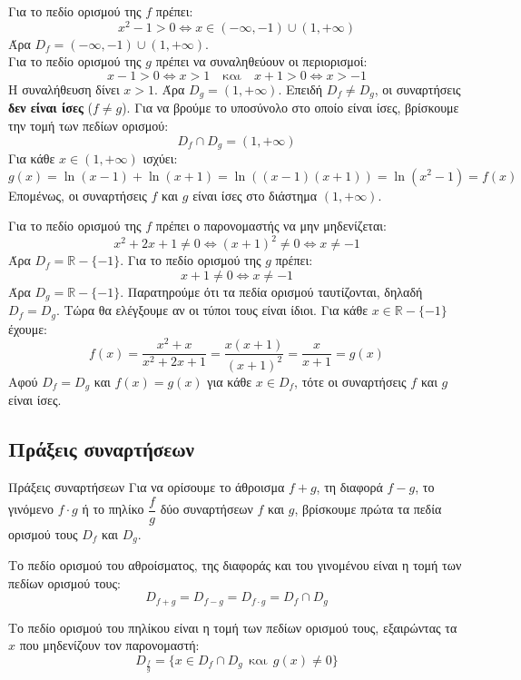 \lysh
\begin{alist}
\item Για το πεδίο ορισμού της $f$ πρέπει:
\[ x^2 - 1 > 0 \Leftrightarrow x \in (-\infty, -1) \cup (1, +\infty) \]
Άρα $D_f = (-\infty, -1) \cup (1, +\infty)$.\\
Για το πεδίο ορισμού της $g$ πρέπει να συναληθεύουν οι περιορισμοί:
\[ x - 1 > 0 \Leftrightarrow x > 1 \quad \text{και} \quad x + 1 > 0 \Leftrightarrow x > -1 \]
Η συναλήθευση δίνει $x > 1$. Άρα $D_g = (1, +\infty)$. Επειδή $D_f \neq D_g$, οι συναρτήσεις \textbf{δεν είναι ίσες} ($f \neq g$). Για να βρούμε το υποσύνολο στο οποίο είναι ίσες, βρίσκουμε την τομή των πεδίων ορισμού:
\[ D_f \cap D_g = (1, +\infty) \]
Για κάθε $x \in (1, +\infty)$ ισχύει:
\[ g(x) = \ln(x-1) + \ln(x+1) = \ln\left((x-1)(x+1)\right) = \ln(x^2 - 1) = f(x) \]
Επομένως, οι συναρτήσεις $f$ και $g$ είναι ίσες στο διάστημα $(1, +\infty)$.

\item Για το πεδίο ορισμού της $f$ πρέπει ο παρονομαστής να μην μηδενίζεται:
\[ x^2+2x+1 \neq 0 \Leftrightarrow (x+1)^2 \neq 0 \Leftrightarrow x \neq -1 \]
Άρα $D_f = \mathbb{R} - \{-1\}$. Για το πεδίο ορισμού της $g$ πρέπει:
\[ x+1 \neq 0 \Leftrightarrow x \neq -1 \]
Άρα $D_g = \mathbb{R} - \{-1\}$. Παρατηρούμε ότι τα πεδία ορισμού ταυτίζονται, δηλαδή $D_f = D_g$. Τώρα θα ελέγξουμε αν οι τύποι τους είναι ίδιοι. Για κάθε $x \in \mathbb{R} - \{-1\}$ έχουμε:
\[ f(x) = \dfrac{x^2+x}{x^2+2x+1} = \dfrac{x(x+1)}{(x+1)^2} = \dfrac{x}{x+1} = g(x) \]
Αφού $D_f = D_g$ και $f(x) = g(x)$ για κάθε $x \in D_f$, τότε οι συναρτήσεις $f$ και $g$ είναι ίσες.
\end{alist}

\subsection{Πράξεις συναρτήσεων}
\begin{askhsh}{Πράξεις συναρτήσεων}
Για να ορίσουμε το άθροισμα $f+g$, τη διαφορά $f-g$, το γινόμενο $f\cdot g$ ή το πηλίκο $\dfrac{f}{g}$ δύο συναρτήσεων $f$ και $g$, βρίσκουμε πρώτα τα πεδία ορισμού τους $D_f$ και $D_g$.\\
\bhmata
\begin{bhma}
\item Το πεδίο ορισμού του αθροίσματος, της διαφοράς και του γινομένου είναι η τομή των πεδίων ορισμού τους:
\[ D_{f+g}=D_{f-g}=D_{f\cdot g} = D_f \cap D_g \]
\item Το πεδίο ορισμού του πηλίκου είναι η τομή των πεδίων ορισμού τους, εξαιρώντας τα $ x $ που μηδενίζουν τον παρονομαστή:
\[ D_{\frac{f}{g}} = \{x \in D_f \cap D_g \ \ \text{και}\ \ g(x) \neq 0\} \]
\end{bhma}
\end{askhsh}


